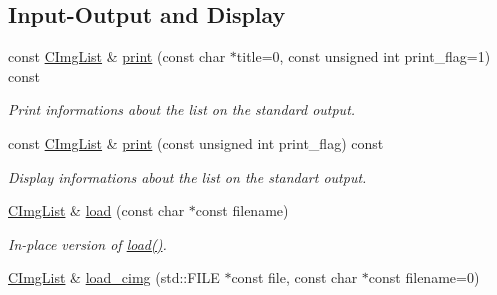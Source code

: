 \subsection*{Input-\/Output and Display}
\label{_amgrp93662cfc615fd0ef4cb6a14342688302}
 \begin{DoxyCompactItemize}
\item 
\hypertarget{structcimg__library_1_1_c_img_list_a903f6445a9f4e2c88af14dfade9a4a98}{
const \hyperlink{structcimg__library_1_1_c_img_list}{CImgList} \& \hyperlink{structcimg__library_1_1_c_img_list_a903f6445a9f4e2c88af14dfade9a4a98}{print} (const char $\ast$title=0, const unsigned int print\_\-flag=1) const }
\label{structcimg__library_1_1_c_img_list_a903f6445a9f4e2c88af14dfade9a4a98}

\begin{DoxyCompactList}\small\item\em Print informations about the list on the standard output. \item\end{DoxyCompactList}\item 
\hypertarget{structcimg__library_1_1_c_img_list_ad4ab8d29e3eeb9dfba53b9cc0d9f4a6f}{
const \hyperlink{structcimg__library_1_1_c_img_list}{CImgList} \& \hyperlink{structcimg__library_1_1_c_img_list_ad4ab8d29e3eeb9dfba53b9cc0d9f4a6f}{print} (const unsigned int print\_\-flag) const }
\label{structcimg__library_1_1_c_img_list_ad4ab8d29e3eeb9dfba53b9cc0d9f4a6f}

\begin{DoxyCompactList}\small\item\em Display informations about the list on the standart output. \item\end{DoxyCompactList}\item 
\hypertarget{structcimg__library_1_1_c_img_list_ae2fce076842991a251d7e7137ee98ea8}{
\hyperlink{structcimg__library_1_1_c_img_list}{CImgList} \& \hyperlink{structcimg__library_1_1_c_img_list_ae2fce076842991a251d7e7137ee98ea8}{load} (const char $\ast$const filename)}
\label{structcimg__library_1_1_c_img_list_ae2fce076842991a251d7e7137ee98ea8}

\begin{DoxyCompactList}\small\item\em In-\/place version of \hyperlink{structcimg__library_1_1_c_img_list_ae2fce076842991a251d7e7137ee98ea8}{load()}. \item\end{DoxyCompactList}\item 
\hypertarget{structcimg__library_1_1_c_img_list_a0faab84e39f84291464191aea2e4836f}{
\hyperlink{structcimg__library_1_1_c_img_list}{CImgList} \& \hyperlink{structcimg__library_1_1_c_img_list_a0faab84e39f84291464191aea2e4836f}{load\_\-cimg} (std::FILE $\ast$const file, const char $\ast$const filename=0)}
\label{structcimg__library_1_1_c_img_list_a0faab84e39f84291464191aea2e4836f}


\end{DoxyCompactItemize}
